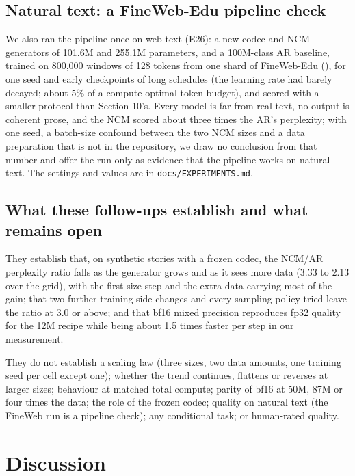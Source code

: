 \documentclass[
  british,
]{article}
\begin{document}
\subsection{Natural text: a FineWeb-Edu pipeline
check}\label{natural-text-a-fineweb-edu-pipeline-check}

We also ran the pipeline once on web text (E26): a new codec and NCM
generators of 101.6M and 255.1M parameters, and a 100M-class AR
baseline, trained on 800,000 windows of 128 tokens from one shard of
FineWeb-Edu (), for one
seed and early checkpoints of long schedules (the learning rate had
barely decayed; about 5\% of a compute-optimal token budget), and scored
with a smaller protocol than Section 10's. Every model is far from real
text, no output is coherent prose, and the NCM scored about three times
the AR's perplexity; with one seed, a batch-size confound between the
two NCM sizes and a data preparation that is not in the repository, we
draw no conclusion from that number and offer the run only as evidence
that the pipeline works on natural text. The settings and values are in
\texttt{docs/EXPERIMENTS.md}.

\subsection{What these follow-ups establish and what remains
open}\label{what-these-follow-ups-establish-and-what-remains-open}

They establish that, on synthetic stories with a frozen codec, the
NCM/AR perplexity ratio falls as the generator grows and as it sees more
data (3.33 to 2.13 over the grid), with the first size step and the
extra data carrying most of the gain; that two further training-side
changes and every sampling policy tried leave the ratio at 3.0 or above;
and that bf16 mixed precision reproduces fp32 quality for the 12M recipe
while being about 1.5 times faster per step in our measurement.

They do not establish a scaling law (three sizes, two data amounts, one
training seed per cell except one); whether the trend continues,
flattens or reverses at larger sizes; behaviour at matched total
compute; parity of bf16 at 50M, 87M or four times the data; the role of
the frozen codec; quality on natural text (the FineWeb run is a pipeline
check); any conditional task; or human-rated quality.

\section{Discussion}\label{discussion}
\end{document}

